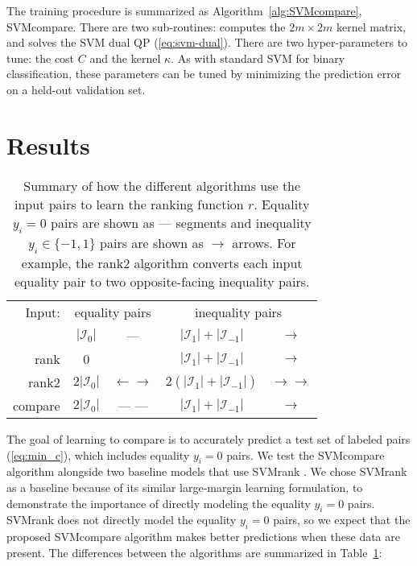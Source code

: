 \documentclass{article}
\begin{document}
The training procedure is summarized as
Algorithm~\ref{alg:SVMcompare}, SVMcompare.
There are two sub-routines:  computes
the $2m\times 2m$ kernel matrix, and  solves the SVM
dual QP (\ref{eq:svm-dual}). There are two hyper-parameters to tune:
the cost $C$ and the kernel $\kappa$. As with standard SVM for binary
classification, these parameters can be tuned by minimizing the
prediction error on a held-out validation set.

\section{Results}
\label{sec:results}

\begin{table}[b!]
  \centering
  \begin{tabular}{r|cc|cc|}
Input:&    \multicolumn{2}{c|}{equality pairs}
&    \multicolumn{2}{c|}{inequality pairs}\\
    & $|\mathcal I_0|$ %
    & --- 
    & $|\mathcal I_1|+|\mathcal I_{-1}|$ %
    & $\rightarrow$
    \\
    \hline
    rank 
    & 0 
    & 
    & $|\mathcal I_1|+|\mathcal I_{-1}|$ 
    & $\rightarrow$ 
    \\
    \hline
    rank2 
    & $2|\mathcal I_0|$ 
    & $\leftarrow \rightarrow$
    & $2(|\mathcal I_1|+|\mathcal I_{-1}|)$ 
    & $\rightarrow \rightarrow$
    \\
    \hline
    compare 
    & $2|\mathcal I_0|$ 
    & --- --- 
    & $|\mathcal I_1|+|\mathcal I_{-1}|$ 
    & $\rightarrow$\\
    \hline
  \end{tabular}
  \caption{\label{tab:models}
    Summary of how the different algorithms 
    use the input pairs to learn the ranking 
    function $r$. Equality $y_i=0$ pairs are shown as ---  
    segments and inequality $y_i\in\{-1,1\}$ pairs 
    are shown as $\rightarrow$  arrows. For example, 
    the rank2 algorithm converts each input equality pair
    to two opposite-facing inequality pairs.}
\end{table}

The goal of learning to compare is to accurately predict a test set of
labeled pairs (\ref{eq:min_c}), which includes equality $y_i=0$
pairs. We test the SVMcompare algorithm alongside two baseline models
that use SVMrank \citep{ranksvm}. We chose SVMrank as a baseline
because of its similar large-margin learning formulation, to
demonstrate the importance of directly modeling the equality $y_i=0$
pairs. SVMrank does not directly model the equality $y_i=0$ pairs, so
we expect that the proposed SVMcompare algorithm makes better
predictions when these data are present. The differences between the
algorithms are summarized in Table~\ref{tab:models}:
\end{document}
